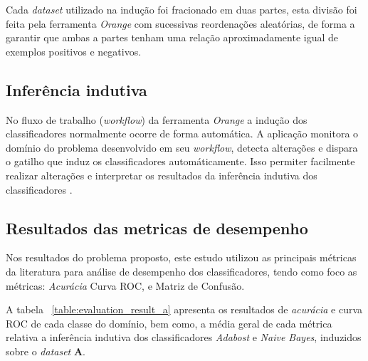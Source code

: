 Cada \textit{dataset} utilizado na indução foi fracionado em duas partes, esta 
divisão foi feita pela ferramenta \textit{Orange} com sucessivas reordenações 
aleatórias, de forma a garantir que ambas a partes tenham uma relação 
aproximadamente igual de exemplos positivos e negativos.

\subsection{Inferência indutiva}

No fluxo de trabalho (\textit{workflow}) da ferramenta \textit{Orange} a 
indução dos classificadores normalmente ocorre de forma automática. A aplicação
monitora o domínio do problema desenvolvido em seu \textit{workflow}, detecta 
alterações e dispara o gatilho que induz os classificadores automáticamente. 
Isso permiter facilmente realizar alterações e interpretar os resultados da 
inferência indutiva dos classificadores \cite{orange_doc}. 

\subsection{Resultados das metricas de desempenho}

Nos resultados do problema proposto, este estudo utilizou as principais métricas 
da literatura para análise de desempenho dos classificadores, tendo como foco 
as métricas: \textit{Acurácia} Curva ROC, e Matriz de Confusão.

A tabela ~\ref{table:evaluation_result_a} apresenta os resultados de 
\textit{acurácia} e curva ROC de cada classe do domínio, bem como, a média 
geral de cada métrica relativa a inferência indutiva dos classificadores 
\textit{Adabost} e \textit{Naive Bayes}, induzidos sobre o \textit{dataset} 
\textbf{A}.

